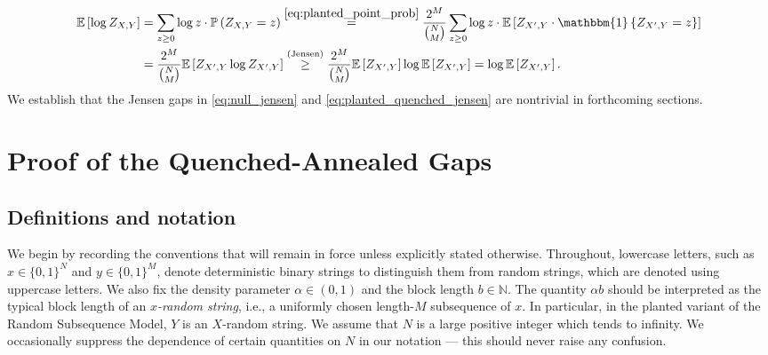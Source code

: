 \documentclass[11pt]{amsart}
\numberwithin{equation}{section}
\numberwithin{equation}{section}
\newcommand{\1}{\mathbbm{1}}
\newcommand{\E}{\mathbb{E}}
\newcommand{\Prob}{\mathbb{P}}
\newcommand{\N}{\mathbb{N}}
\theoremstyle{definition}
\newenvironment{remark}
  {\pushQED{\qed}\renewcommand{\qedsymbol}{$\triangle$}\remarkx}
  {\popQED\endremarkx}
\begin{document}
\begin{remark}
    \begin{align}
        \E\left[ \log Z_{X,Y} \right] & = \sum_{z \geq 0} \log z \cdot \Prob\left( Z_{X,Y} = z \right) \stackrel{\eqref{eq:planted_point_prob}}{=} \frac{2^M}{\binom{N}{M}} \sum_{z \geq 0} \log z \cdot \E\left[ Z_{X',Y} \cdot \1\left\{Z_{X',Y} = z \right\} \right] \nonumber \\
        & = \frac{2^M}{\binom{N}{M}} \E\left[ Z_{X',Y} \log Z_{X',Y} \right] \stackrel{\text{(Jensen)}}{\geq} \frac{2^M}{\binom{N}{M}} \E\left[ Z_{X',Y} \right] \log \E\left[ Z_{X',Y} \right] = \log \E\left[ Z_{X',Y} \right]. \label{eq:planted_quenched_jensen}
    \end{align}
    We establish that the Jensen gaps in \eqref{eq:null_jensen} and \eqref{eq:planted_quenched_jensen} are nontrivial in forthcoming sections.
\end{remark}

\section{Proof of the Quenched-Annealed Gaps} \label{sec:main_result_upper_bound}

\subsection{Definitions and notation} \label{subsec:defns_and_notation}

We begin by recording the conventions that will remain in force unless explicitly stated otherwise. Throughout, lowercase letters, such as $x \in \{0,1\}^N$ and $y \in \{0,1\}^M$, denote deterministic binary strings to distinguish them from random strings, which are denoted using uppercase letters. We also fix the density parameter $\alpha \in (0,1)$ and the block length $b \in \N$. The quantity $\alpha b$ should be interpreted as the typical block length of an \textit{$x$-random string}, i.e., a uniformly chosen length-$M$ subsequence of $x$. In particular, in the planted variant of the Random Subsequence Model, $Y$ is an $X$-random string. We assume that $N$ is a large positive integer which tends to infinity. We occasionally suppress the dependence of certain quantities on $N$ in our notation --- this should never raise any confusion. 
\end{document}
